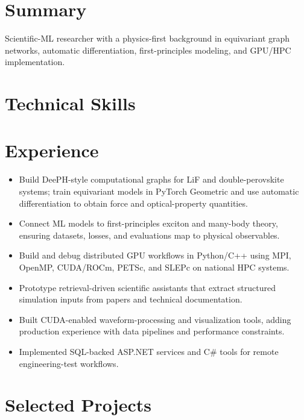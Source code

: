 \section{Summary}
Scientific-ML researcher with a physics-first background in equivariant graph networks, automatic differentiation, first-principles modeling, and GPU/HPC implementation.
\section{Technical Skills}
\section{Experience}
\begin{itemize}
\item Build DeePH-style computational graphs for LiF and double-perovskite systems; train equivariant models in PyTorch Geometric and use automatic differentiation to obtain force and optical-property quantities.
\item Connect ML models to first-principles exciton and many-body theory, ensuring datasets, losses, and evaluations map to physical observables.
\item Build and debug distributed GPU workflows in Python/C++ using MPI, OpenMP, CUDA/ROCm, PETSc, and SLEPc on national HPC systems.
\item Prototype retrieval-driven scientific assistants that extract structured simulation inputs from papers and technical documentation.
\end{itemize}
\begin{itemize}
\item Built CUDA-enabled waveform-processing and visualization tools, adding production experience with data pipelines and performance constraints.
\item Implemented SQL-backed ASP.NET services and C\# tools for remote engineering-test workflows.
\end{itemize}
\section{Selected Projects}
